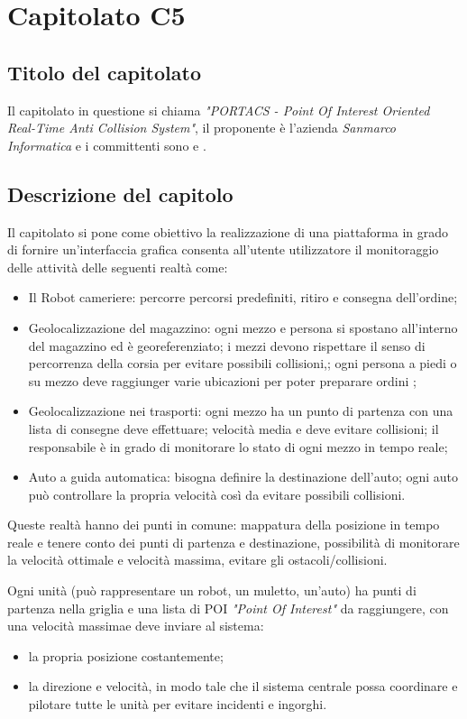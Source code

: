 \section{Capitolato C5}
\subsection{Titolo del capitolato}
Il capitolato in questione si chiama \textit{"PORTACS - Point Of Interest  Oriented Real-Time Anti Collision System"}, il proponente \`e l'azienda \textit{Sanmarco Informatica} e i committenti sono \VT{} e \CR{}.

\subsection{Descrizione del capitolo}
Il capitolato si pone come obiettivo la realizzazione di una piattaforma in grado di fornire un'interfaccia grafica consenta all'utente utilizzatore il monitoraggio delle attività delle seguenti realtà come:\begin{itemize}
\item Il Robot cameriere: percorre percorsi predefiniti, ritiro e consegna dell'ordine;
\item Geolocalizzazione del magazzino: ogni mezzo e persona si spostano all'interno del magazzino ed è georeferenziato;  i mezzi devono rispettare il senso di percorrenza della corsia per evitare possibili collisioni,; ogni persona a piedi o su mezzo deve raggiunger varie ubicazioni per poter preparare ordini ;
\item Geolocalizzazione nei trasporti: ogni mezzo ha un punto di partenza con una lista di consegne deve effettuare; velocità media e deve evitare collisioni; il responsabile è in grado di monitorare lo stato di ogni mezzo in tempo reale;
\item Auto a guida automatica: bisogna definire la destinazione dell'auto; ogni auto può controllare la propria velocità così da evitare possibili collisioni.
\end{itemize}
Queste realtà hanno dei punti in comune: mappatura della posizione in tempo reale e tenere conto dei punti di partenza e destinazione, possibilità di monitorare la velocità ottimale e velocità massima, evitare gli ostacoli/collisioni. 

Ogni unità (può rappresentare un robot, un muletto, un'auto) ha punti di partenza nella griglia e una lista di POI \textit{"Point Of Interest"} da raggiungere, con una velocità massimae deve inviare al sistema: 
\begin{itemize}
\item la propria posizione costantemente;
\item la direzione e velocità, in modo tale che il sistema centrale possa coordinare e pilotare tutte le unità  per evitare incidenti e ingorghi.

\end{itemize}

